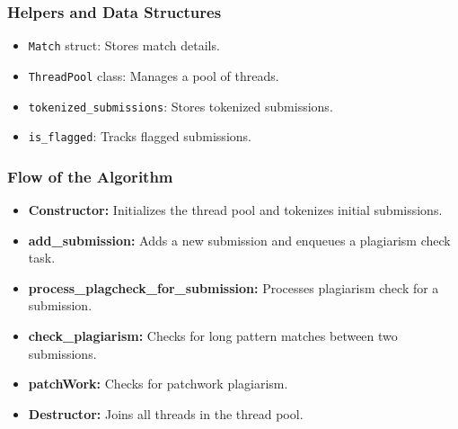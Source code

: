 \documentclass{article}
\begin{document}
\subsubsection{Helpers and Data Structures}
\begin{itemize}
    \item \texttt{Match} struct: Stores match details.
    \item \texttt{ThreadPool} class: Manages a pool of threads.
    \item \texttt{tokenized\_submissions}: Stores tokenized submissions.
    \item \texttt{is\_flagged}: Tracks flagged submissions.
\end{itemize}

\subsubsection{Flow of the Algorithm}
\begin{itemize}
    \item \textbf{Constructor:} Initializes the thread pool and tokenizes initial submissions.
    \item \textbf{add\_submission:} Adds a new submission and enqueues a plagiarism check task.
    \item \textbf{process\_plagcheck\_for\_submission:} Processes plagiarism check for a submission.
    \item \textbf{check\_plagiarism:} Checks for long pattern matches between two submissions.
    \item \textbf{patchWork:} Checks for patchwork plagiarism.
    \item \textbf{Destructor:} Joins all threads in the thread pool.
\end{itemize}
\end{document}
